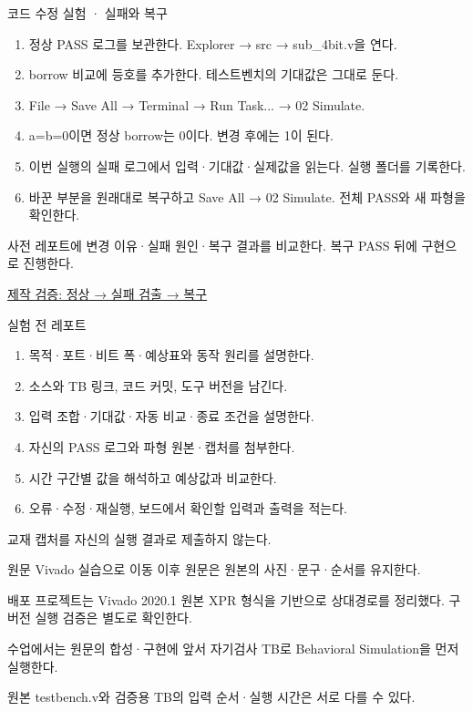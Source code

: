 \begin{frame}{코드 수정 실험 · 실패와 복구}\relax
\small
\begin{enumerate}\setlength{\itemsep}{0.22cm}
\item 정상 PASS 로그를 보관한다. Explorer → src → sub\_4bit.v을 연다.
\item borrow 비교에 등호를 추가한다. 테스트벤치의 기대값은 그대로 둔다.
\item File → Save All → Terminal → Run Task... → 02 Simulate.
\item a=b=0이면 정상 borrow는 0이다. 변경 후에는 1이 된다.
\item 이번 실행의 실패 로그에서 입력·기대값·실제값을 읽는다. 실행 폴더를 기록한다.
\item 바꾼 부분을 원래대로 복구하고 Save All → 02 Simulate. 전체 PASS와 새 파형을 확인한다.
\end{enumerate}
사전 레포트에 변경 이유·실패 원인·복구 결과를 비교한다. 복구 PASS 뒤에 구현으로 진행한다.\par\href{https://github.com/Glaysia/ece2_26_2_2/blob/daily/0910/example/fpga_projects_hdl/LAB1/docs/student-modification-validation.json}{제작 검증: 정상 → 실패 검출 → 복구}
\end{frame}

\begin{frame}{실험 전 레포트}\relax
\small
\begin{enumerate}\setlength{\itemsep}{0.22cm}
\item 목적·포트·비트 폭·예상표와 동작 원리를 설명한다.
\item 소스와 TB 링크, 코드 커밋, 도구 버전을 남긴다.
\item 입력 조합·기대값·자동 비교·종료 조건을 설명한다.
\item 자신의 PASS 로그와 파형 원본·캡처를 첨부한다.
\item 시간 구간별 값을 해석하고 예상값과 비교한다.
\item 오류·수정·재실행, 보드에서 확인할 입력과 출력을 적는다.
\end{enumerate}
교재 캡처를 자신의 실행 결과로 제출하지 않는다.\par
\end{frame}

\begin{frame}[label=legacy-04-vivado]{원문 Vivado 실습으로 이동}\relax
\small
이후 원문은 원본의 사진·문구·순서를 유지한다.\par\vspace{0.22cm}배포 프로젝트는 Vivado 2020.1 원본 XPR 형식을 기반으로 상대경로를 정리했다. 구버전 실행 검증은 별도로 확인한다.\par\vspace{0.22cm}수업에서는 원문의 합성·구현에 앞서 자기검사 TB로 Behavioral Simulation을 먼저 실행한다.\par\vspace{0.22cm}원본 testbench.v와 검증용 TB의 입력 순서·실행 시간은 서로 다를 수 있다.\par
\end{frame}

